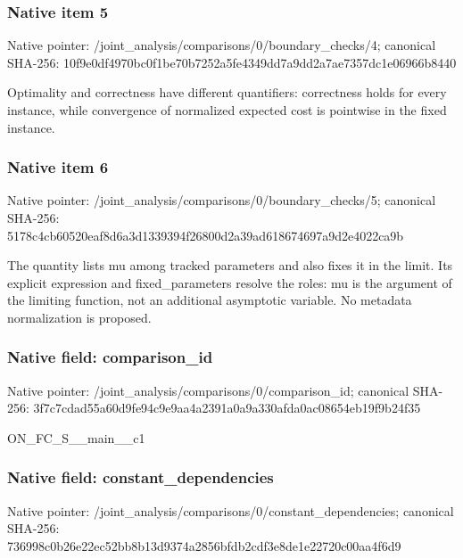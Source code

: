 \documentclass[10pt,a4paper]{article}
\begin{document}
\subsubsection{Native item 5}
Native pointer: /joint\_\allowbreak{}analysis/comparisons/0/boundary\_\allowbreak{}checks/4; canonical SHA-256: 10f9e0df4970bc0f1be70b7252a5fe4349dd7a9dd2a7ae7357dc1e06966b8440

\begingroup\raggedright\sloppy Optimality and correctness have different quantifiers:\allowbreak{} correctness holds for every instance,\allowbreak{} while convergence of normalized expected cost is pointwise in the fixed instance.\par\endgroup

\subsubsection{Native item 6}
Native pointer: /joint\_\allowbreak{}analysis/comparisons/0/boundary\_\allowbreak{}checks/5; canonical SHA-256: 5178c4cb60520eaf8d6a3d1339394f26800d2a39ad618674697a9d2e4022ca9b

\begingroup\raggedright\sloppy The quantity lists mu among tracked parameters and also fixes it in the limit. Its explicit expression and fixed\_\allowbreak{}parameters resolve the roles:\allowbreak{} mu is the argument of the limiting function,\allowbreak{} not an additional asymptotic variable. No metadata normalization is proposed.\par\endgroup

\subsubsection{Native field: comparison\_\allowbreak{}id}
Native pointer: /joint\_\allowbreak{}analysis/comparisons/0/comparison\_\allowbreak{}id; canonical SHA-256: 3f7c7cdad55a60d9fe94c9e9aa4a2391a0a9a330afda0ac08654eb19f9b24f35

\begingroup\raggedright\sloppy ON\_\allowbreak{}FC\_\allowbreak{}S\_\allowbreak{}\_\allowbreak{}main\_\allowbreak{}\_\allowbreak{}c1\par\endgroup

\subsubsection{Native field: constant\_\allowbreak{}dependencies}
Native pointer: /joint\_\allowbreak{}analysis/comparisons/0/constant\_\allowbreak{}dependencies; canonical SHA-256: 736998c0b26e22ec52bb8b13d9374a2856bfdb2cdf3e8de1e22720c00aa4f6d9
\end{document}
